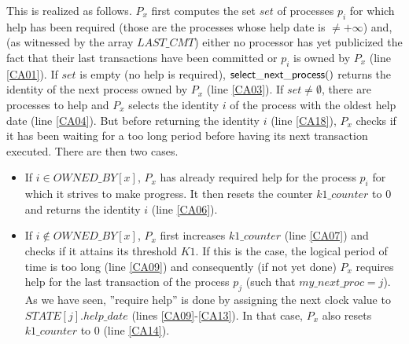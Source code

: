 This is realized as follows. $P_x$ first computes the set $set$ of 
processes $p_i$ for which help has been required (those are the processes
 whose help date is $\neq +\infty$) and, (as witnessed by the array 
$\mathit{LAST\_CMT}$) either no processor has yet publicized the fact that
their last transactions have been committed  or $p_i$ is owned by $P_x$
(line  \ref{CA01}). 
If $set$ is empty (no help is required),  ${\sf select\_next\_process}()$
returns the identity of the next process owned by $P_x$ (line \ref{CA03}). 
If $set\neq \emptyset$, there are processes to help and $P_x$ selects the
identity $i$ of the process with the oldest help date  (line \ref{CA04}).  
But before returning the identity $i$ (line \ref{CA18}), $P_x$ 
checks if it has been  waiting for a too long period before having its next 
transaction executed.  There are then two cases. 
%
\begin{itemize}
\item 
If $i \in \mathit{OWNED\_BY}[x]$,  $P_x$ has already required 
help for the process $p_i$ for which it strives to make progress. 
It then resets the counter $k1\_counter$ to $0$
and returns the identity $i$  (line \ref{CA06}). 
%
\item 
If $i \notin \mathit{OWNED\_BY}[x]$, $P_x$ first increases  $k1\_counter$ 
(line \ref{CA07}) and  checks if it  attains its threshold $K1$. If this is 
the case, the logical period of time is too long  (line \ref{CA09}) and  
consequently (if not yet done) $P_x$ requires help for the last 
transaction of the process $p_j$ (such that $my\_next\_proc=j$).
As we have seen, ''require help'' is done by 
assigning the next clock value to $\mathit{STATE}[j].help\_date$  
(lines \ref{CA09}-\ref{CA13}). In that case,  $P_x$  also  resets  
$k1\_counter$ to $0$  (line \ref{CA14}). 
\end{itemize}




